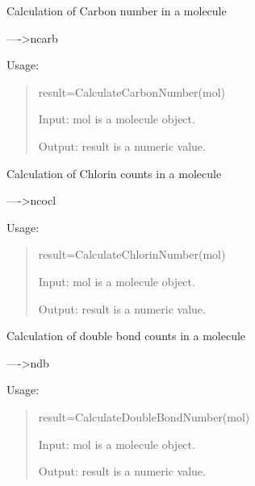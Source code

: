 \documentclass[letterpaper,10pt,english]{sphinxmanual}
\begin{document}

\begin{fulllineitems}
\label{reference/constitution:constitution.CalculateCarbonNumber}
Calculation of Carbon number in a molecule

----\textgreater{}ncarb

Usage:
\begin{quote}

result=CalculateCarbonNumber(mol)

Input: mol is a molecule object.

Output: result is a numeric value.
\end{quote}

\end{fulllineitems}


\begin{fulllineitems}
\label{reference/constitution:constitution.CalculateChlorinNumber}
Calculation of Chlorin counts in a molecule

----\textgreater{}ncocl

Usage:
\begin{quote}

result=CalculateChlorinNumber(mol)

Input: mol is a molecule object.

Output: result is a numeric value.
\end{quote}

\end{fulllineitems}


\begin{fulllineitems}
\label{reference/constitution:constitution.CalculateDoubleBondNumber}
Calculation of double bond counts in a molecule

----\textgreater{}ndb

Usage:
\begin{quote}

result=CalculateDoubleBondNumber(mol)

Input: mol is a molecule object.

Output: result is a numeric value.
\end{quote}

\end{fulllineitems}
\end{document}
